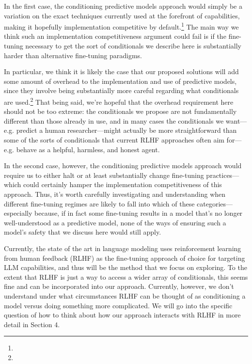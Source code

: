 {In the first case, the conditioning predictive models approach would simply be a variation on the exact techniques currently used at the forefront of capabilities, making it hopefully implementation competitive by default.\footnote{} The main way we think such an implementation competitiveness argument could fail is if the fine-tuning necessary to get the sort of conditionals we describe here is substantially harder than alternative fine-tuning paradigms.

In particular, we think it is likely the case that our proposed solutions will add some amount of overhead to the implementation and use of predictive models, since they involve being substantially more careful regarding what conditionals are used.\footnote{} That being said, we're hopeful that the overhead requirement here should not be too extreme: the conditionals we propose are not fundamentally different than those already in use, and in many cases the conditionals we want---e.g. predict a human researcher---might actually be more straightforward than some of the sorts of conditionals that current RLHF approaches often aim for---e.g. behave as a helpful, harmless, and honest agent\cite{TODO: cite https://arxiv.org/abs/2204.05862}.

In the second case, however, the conditioning predictive models approach would require us to either halt or at least substantially change fine-tuning practices---which could certainly hamper the implementation competitiveness of this approach. Thus, it's worth carefully investigating and understanding when different fine-tuning regimes are likely to fall into which of these categories---especially because, if in fact some fine-tuning results in a model that's no longer well-understood as a predictive model, none of the ways of ensuring such a model's safety that we discuss here would still apply.

Currently, the state of the art in language modeling uses reinforcement learning from human feedback (RLHF) as the fine-tuning approach of choice for targeting LLM capabilities, and thus will be the method that we focus on exploring. To the extent that RLHF is just a way to access a wider array of conditionals\cite{TODO: cite https://www.alignmentforum.org/posts/chevXfQmRYrTZnj8r/conditioning-prompts-and-fine-tuning}, this seems fine and can be incorporated into our approach. Currently, however, we don't understand under what circumstances RLHF can be thought of as conditioning a model versus doing something more complicated. We will go into the specific question of how to think about how our approach interacts with RLHF in more detail in Section 4\cite{TODO: cite TODO}.

}
